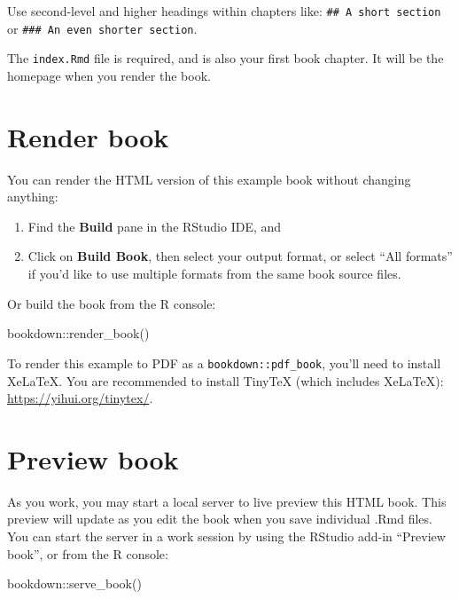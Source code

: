\documentclass[
]{book}
\newenvironment{Shaded}{\begin{snugshade}}{\end{snugshade}}
\newcommand{\FunctionTok}[1]{\textcolor[rgb]{0.00,0.00,0.00}{#1}}
\newcommand{\NormalTok}[1]{#1}
\newcommand{\SpecialCharTok}[1]{\textcolor[rgb]{0.00,0.00,0.00}{#1}}
\begin{document}
Use second-level and higher headings within chapters like: \texttt{\#\#\ A\ short\ section} or \texttt{\#\#\#\ An\ even\ shorter\ section}.

The \texttt{index.Rmd} file is required, and is also your first book chapter. It will be the homepage when you render the book.

\hypertarget{render-book}{%
\section{Render book}\label{render-book}}

You can render the HTML version of this example book without changing anything:

\begin{enumerate}
\def\labelenumi{\arabic{enumi}.}
\item
  Find the \textbf{Build} pane in the RStudio IDE, and
\item
  Click on \textbf{Build Book}, then select your output format, or select ``All formats'' if you'd like to use multiple formats from the same book source files.
\end{enumerate}

Or build the book from the R console:

\begin{Shaded}
\begin{Highlighting}[]
\NormalTok{bookdown}\SpecialCharTok{::}\FunctionTok{render\_book}\NormalTok{()}
\end{Highlighting}
\end{Shaded}

To render this example to PDF as a \texttt{bookdown::pdf\_book}, you'll need to install XeLaTeX. You are recommended to install TinyTeX (which includes XeLaTeX): \url{https://yihui.org/tinytex/}.

\hypertarget{preview-book}{%
\section{Preview book}\label{preview-book}}

As you work, you may start a local server to live preview this HTML book. This preview will update as you edit the book when you save individual .Rmd files. You can start the server in a work session by using the RStudio add-in ``Preview book'', or from the R console:

\begin{Shaded}
\begin{Highlighting}[]
\NormalTok{bookdown}\SpecialCharTok{::}\FunctionTok{serve\_book}\NormalTok{()}
\end{Highlighting}
\end{Shaded}
\end{document}
